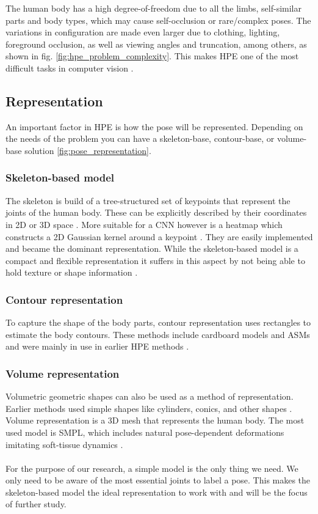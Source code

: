 The human body has a high degree-of-freedom due to all the limbs, self-similar parts and body types, which may cause self-occlusion or rare/complex poses.
The variations in configuration are made even larger due to clothing, lighting, foreground occlusion, as well as viewing angles and truncation, among others, as shown in fig. \ref{fig:hpe_problem_complexity}.
This makes \gls{HPE} one of the most difficult tasks in computer vision \cite{jain2014}\cite{Chen2000}.

\subsection{Representation}
\label{section:representation}

An important factor in \gls{HPE} is how the pose will be represented.
Depending on the needs of the problem you can have a skeleton-base, contour-base, or volume-base solution \cite{Chen2000}\ref{fig:pose_representation}.

\subsubsection{Skeleton-based model}
The skeleton is build of a tree-structured set of keypoints that represent the joints of the human body.
These can be explicitly described by their coordinates in 2D or 3D space \cite{Toshev2014}.
More suitable for a \gls{CNN} however is a heatmap which constructs a 2D Gaussian kernel around a keypoint \cite{Liu2104}\cite{SWARH}.
They are easily implemented and became the dominant representation.
While the skeleton-based model is a compact and flexible representation it suffers in this aspect by not being able to hold texture or shape information \cite{Zheng2012}.

\subsubsection{Contour representation}
To capture the shape of the body parts, contour representation uses rectangles to estimate the body contours.
These methods include cardboard models \cite{Ju96} and \gls{ASMs} \cite{COOTES95} and were mainly in use in earlier \gls{HPE} methods \cite{Chen2000}.

\subsubsection{Volume representation}
Volumetric geometric shapes can also be used as a method of representation.
Earlier methods used simple shapes like cylinders, conics, and other shapes \cite{Sidenbladh2000}.
Volume representation is a 3D mesh that represents the human body.
The most used model is \gls{SMPL}, which includes natural pose-dependent deformations imitating soft-tissue dynamics \cite{Loper2015}.  
\\
\\
For the purpose of our research, a simple model is the only thing we need.
We only need to be aware of the most essential joints to label a pose.
This makes the skeleton-based model the ideal representation to work with and will be the focus of further study.

